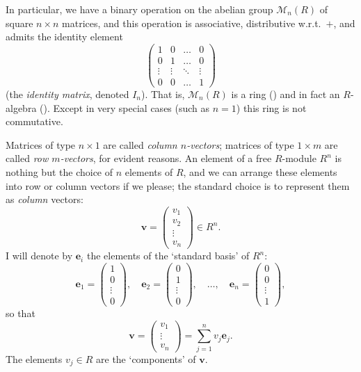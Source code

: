In particular, we have a binary operation on the abelian group
$\mathcal{M}_n(R)$ of square $n \times n$ matrices, and this operation
is associative, distributive w.r.t.\ $+$, and admits the identity
element
\[
  \begin{pmatrix}
    1 & 0 & \dots & 0 \\
    0 & 1 & \dots & 0 \\
    \vdots & \vdots & \ddots & \vdots \\
    0 & 0 & \dots & 1
  \end{pmatrix}
\]
(the \emph{identity matrix}, denoted $I_n$). That is,
$\mathcal{M}_n(R)$ is a ring
() and in fact an
$R$-algebra ().  Except
in very special cases (such as $n = 1$) this ring is not commutative.

Matrices of type $n \times 1$ are called \emph{column $n$-vectors};
matrices of type $1 \times m$ are called \emph{row $m$-vectors}, for
evident reasons. An element of a free $R$-module $R^n$ is nothing but
the choice of $n$ elements of $R$, and we can arrange these elements
into row or column vectors if we please; the standard choice is to
represent them as \emph{column} vectors:
\[
  \mathbf{v} = \begin{pmatrix} v_1 \\ v_2 \\ \vdots \\
    v_n \end{pmatrix} \in R^n.
\]
I will denote by $\mathbf{e}_i$ the elements of the `standard basis'
of $R^n$:
\[
  \mathbf{e}_1 = \begin{pmatrix} 1 \\ 0 \\ \vdots \\ 0 \end{pmatrix},
  \quad \mathbf{e}_2 = \begin{pmatrix} 0 \\ 1 \\ \vdots \\
    0 \end{pmatrix}, \quad \dots, \quad \mathbf{e}_n = \begin{pmatrix}
      0 \\ 0 \\ \vdots \\ 1 \end{pmatrix},
  \]
  so that
  \[
    \mathbf{v} = \begin{pmatrix} v_1 \\ \vdots \\ v_n \end{pmatrix} =
    \sum_{j=1}^n v_j \mathbf{e}_j.
  \]
  The elements $v_j \in R$ are the `components' of $\mathbf{v}$.

